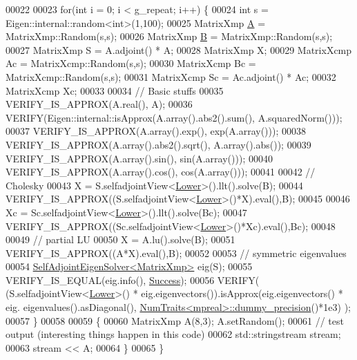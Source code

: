 \begin{DoxyCode}
00022 
00023   \textcolor{keywordflow}{for}(\textcolor{keywordtype}{int} i = 0; i < g\_repeat; i++) \{
00024     \textcolor{keywordtype}{int} s = Eigen::internal::random<int>(1,100);
00025     MatrixXmp \hyperlink{group___core___module_class_eigen_1_1_matrix}{A} = MatrixXmp::Random(s,s);
00026     MatrixXmp \hyperlink{group___core___module_class_eigen_1_1_matrix}{B} = MatrixXmp::Random(s,s);
00027     MatrixXmp S = A.adjoint() * A;
00028     MatrixXmp X;
00029     MatrixXcmp Ac = MatrixXcmp::Random(s,s);
00030     MatrixXcmp Bc = MatrixXcmp::Random(s,s);
00031     MatrixXcmp Sc = Ac.adjoint() * Ac;
00032     MatrixXcmp Xc;
00033     
00034     \textcolor{comment}{// Basic stuffs}
00035     VERIFY\_IS\_APPROX(A.real(), A);
00036     VERIFY(Eigen::internal::isApprox(A.array().abs2().sum(), A.squaredNorm()));
00037     VERIFY\_IS\_APPROX(A.array().exp(),         exp(A.array()));
00038     VERIFY\_IS\_APPROX(A.array().abs2().sqrt(), A.array().abs());
00039     VERIFY\_IS\_APPROX(A.array().sin(),         sin(A.array()));
00040     VERIFY\_IS\_APPROX(A.array().cos(),         cos(A.array()));
00041 
00042     \textcolor{comment}{// Cholesky}
00043     X = S.selfadjointView<\hyperlink{group__enums_gga39e3366ff5554d731e7dc8bb642f83cda891792b8ed394f7607ab16dd716f60e6}{Lower}>().llt().solve(B);
00044     VERIFY\_IS\_APPROX((S.selfadjointView<\hyperlink{group__enums_gga39e3366ff5554d731e7dc8bb642f83cda891792b8ed394f7607ab16dd716f60e6}{Lower}>()*X).eval(),B);
00045 
00046     Xc = Sc.selfadjointView<\hyperlink{group__enums_gga39e3366ff5554d731e7dc8bb642f83cda891792b8ed394f7607ab16dd716f60e6}{Lower}>().llt().solve(Bc);
00047     VERIFY\_IS\_APPROX((Sc.selfadjointView<\hyperlink{group__enums_gga39e3366ff5554d731e7dc8bb642f83cda891792b8ed394f7607ab16dd716f60e6}{Lower}>()*Xc).eval(),Bc);
00048     
00049     \textcolor{comment}{// partial LU}
00050     X = A.lu().solve(B);
00051     VERIFY\_IS\_APPROX((A*X).eval(),B);
00052 
00053     \textcolor{comment}{// symmetric eigenvalues}
00054     \hyperlink{group___eigenvalues___module_class_eigen_1_1_self_adjoint_eigen_solver}{SelfAdjointEigenSolver<MatrixXmp>} eig(S);
00055     VERIFY\_IS\_EQUAL(eig.info(), \hyperlink{group__enums_gga85fad7b87587764e5cf6b513a9e0ee5ea52581b035f4b59c203b8ff999ef5fcea}{Success});
00056     VERIFY( (S.selfadjointView<\hyperlink{group__enums_gga39e3366ff5554d731e7dc8bb642f83cda891792b8ed394f7607ab16dd716f60e6}{Lower}>() * eig.eigenvectors()).isApprox(eig.eigenvectors() * eig.
      eigenvalues().asDiagonal(), \hyperlink{group___core___module_struct_eigen_1_1_num_traits}{NumTraits<mpreal>::dummy\_precision}()*1e3) );
00057   \}
00058   
00059   \{
00060     MatrixXmp A(8,3); A.setRandom();
00061     \textcolor{comment}{// test output (interesting things happen in this code)}
00062     std::stringstream stream;
00063     stream << A;
00064   \}
00065 \}
\end{DoxyCode}
